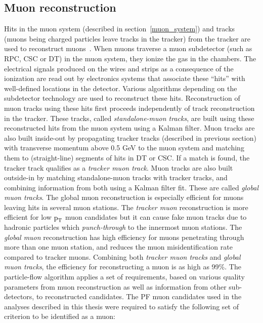 \subsection{Muon reconstruction}
\label{mu_recon}
Hits in the muon system (described in section~\ref{muon_system}) and tracks (muons being charged particles leave tracks in the tracker) from the tracker are used to reconstruct muons~\cite{muon_recon2018}. When muons traverse a muon subdetector (such as RPC, CSC or DT) in the muon system, they ionize the gas in the chambers. The electrical signals produced on the wires and strips as a consequence of the ionization are read out by electronics systems that associate these ``hits'' with well-defined locations in the detector. Various algorithms depending on the subdetector technology are used to reconstruct these hits. Reconstruction of muon tracks using these hits first proceeds independently of track reconstruction in the tracker. These tracks, called \textit{standalone-muon tracks}, are built using these reconstructed hits from the muon system using a Kalman filter. Muon tracks are also built inside-out by propagating tracker tracks (described in previous section) with transverse momentum above 0.5 GeV to the muon system and matching them to (straight-line) segments of hits in DT or CSC. If a match is found, the tracker track qualifies as a \textit{tracker muon track}. Muon tracks are also  built outside-in  by matching standalone-muon tracks with tracker tracks, and combining information from both using a Kalman filter fit. These are called \textit{global muon tracks}. The global muon reconstruction is especially efficient for muons leaving hits in several muon stations. The \textit{tracker muon} reconstruction is more efficient for low $\text{p}_\text{T}$ muon candidates but it can cause fake muon tracks due to hadronic particles which \textit{punch-through} to the innermost muon stations. The \textit{global muon} reconstruction has  high efficiency for muons penetrating through more than one muon station, and reduces the muon misidentification rate compared to tracker muons. Combining both \textit{tracker muon tracks} and \textit{global muon tracks}, the efficiency for reconstructing a muon is as high as 99\%. The particle-flow algorithm applies a set of requirements, based on various quality parameters from muon reconstruction as well as information from other sub-detectors, to reconstructed candidates. The PF muon candidates used in the analyses described in this thesis were required to satisfy the following set of criterion to be identified as a muon:

